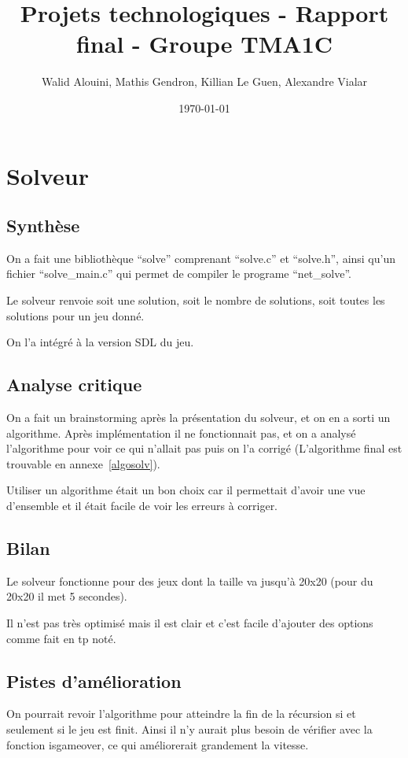 \documentclass[12pt]{article}
\begin{document}
\title{Projets technologiques - Rapport final - Groupe TMA1C}
\author{Walid Alouini, Mathis Gendron, Killian Le Guen, Alexandre Vialar}
\date{\today}

\maketitle

\tableofcontents

\section{Solveur}
\subsection{Synthèse}
On a fait une bibliothèque ``solve'' comprenant ``solve.c'' et ``solve.h'', ainsi qu'un fichier ``solve\_main.c'' qui permet de compiler le programe ``net\_solve''.

Le solveur renvoie soit une solution, soit le nombre de solutions, soit toutes les solutions pour un jeu donné.

On l'a intégré à la version SDL du jeu.
\subsection{Analyse critique}
On a fait un brainstorming après la présentation du solveur, et on en a sorti un algorithme. Après implémentation il ne fonctionnait pas, et on a analysé l'algorithme pour voir ce qui n'allait pas puis on l'a corrigé (L'algorithme final est trouvable en annexe~\ref{algosolv}).

Utiliser un algorithme était un bon choix car il permettait d'avoir une vue d'ensemble et il était facile de voir les erreurs à corriger.
\subsection{Bilan}
Le solveur fonctionne pour des jeux dont la taille va jusqu'à 20x20 (pour du 20x20 il met 5 secondes).

Il n'est pas très optimisé mais il est clair et c'est facile d'ajouter des options comme fait en tp noté.
\subsection{Pistes d'amélioration}
On pourrait revoir l'algorithme pour atteindre la fin de la récursion si et seulement si le jeu est finit. Ainsi il n'y aurait plus besoin de vérifier avec la fonction isgameover, ce qui améliorerait grandement la vitesse.
\end{document}
